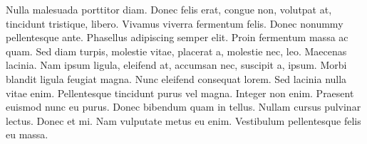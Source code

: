 Nulla malesuada porttitor diam. Donec felis erat, congue non,
volutpat at, tincidunt tristique, libero. Vivamus viverra fermentum felis. Donec
nonummy pellentesque ante. Phasellus adipiscing semper elit. Proin fermentum
massa ac quam. Sed diam turpis, molestie vitae, placerat a, molestie nec, leo.
Maecenas lacinia. Nam ipsum ligula, eleifend at, accumsan nec, suscipit a,
ipsum. Morbi blandit ligula feugiat magna. Nunc eleifend consequat lorem.
Sed lacinia nulla vitae enim. Pellentesque tincidunt purus vel magna. Integer
non enim. Praesent euismod nunc eu purus. Donec bibendum quam in tellus.
Nullam cursus pulvinar lectus. Donec et mi. Nam vulputate metus eu enim.
Vestibulum pellentesque felis eu massa.
